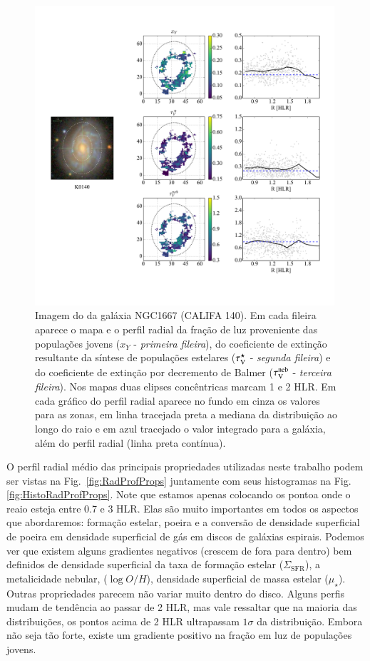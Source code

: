 \begin{figure}
	\centering
	\includegraphics[width=0.99\textwidth]{figuras/K0140_xY_radialProfile_realsample.pdf}
	\caption[Imagem e exemplos de mapas e perfis radiais]
	{Imagem do \SDSS da galáxia NGC1667 (CALIFA 140). Em cada fileira aparece o mapa e o perfil radial
da fração de luz proveniente das populações jovens ($x_Y$ - \emph{primeira fileira}), do
coeficiente de extinção resultante da síntese de populações estelares ($\tau_{\mathrm{V}}^\star$ - \emph{segunda
fileira}) e do coeficiente de extinção por decremento de Balmer ($\tau_{\mathrm{V}}^{\mathrm{neb}}$ - \emph{terceira
fileira}). Nos mapas duas elipses concêntricas marcam 1 e 2 HLR. Em cada gráfico do perfil radial
aparece no fundo em cinza os valores para as zonas, em linha tracejada preta a mediana da
distribuição ao longo do raio e em azul tracejado o valor integrado para a galáxia, além do perfil
radial (linha preta contínua).}
	\label{fig:K0140xYRadProf}
\end{figure}

O perfil radial médio das principais propriedades utilizadas neste trabalho podem ser vistas na
Fig.\ \ref{fig:RadProfProps} juntamente com seus histogramas na Fig. \ref{fig:HistoRadProfProps}.
Note que estamos apenas colocando os pontoa onde o reaio esteja entre 0.7 e 3 HLR. Elas são muito
importantes em todos os aspectos que abordaremos: formação estelar, poeira e a conversão de
densidade superficial de poeira em densidade superficial de gás em discos de galáxias espirais.
Podemos ver que existem alguns gradientes negativos (crescem de fora para dentro) bem definidos de
densidade superficial da taxa de formação estelar ($\Sigma_{\mathrm{SFR}}$), a metalicidade nebular,
($\log O/H$), densidade superficial de massa estelar ($\mu_\star$). Outras propriedades parecem não
variar muito dentro do disco. Alguns perfis mudam de tendência ao passar de 2 HLR, mas vale
ressaltar que na maioria das distribuições, os pontos acima de 2 HLR ultrapassam $1\sigma$ da
distribuição. Embora não seja tão forte, existe um gradiente positivo na fração em luz de populações
jovens.


